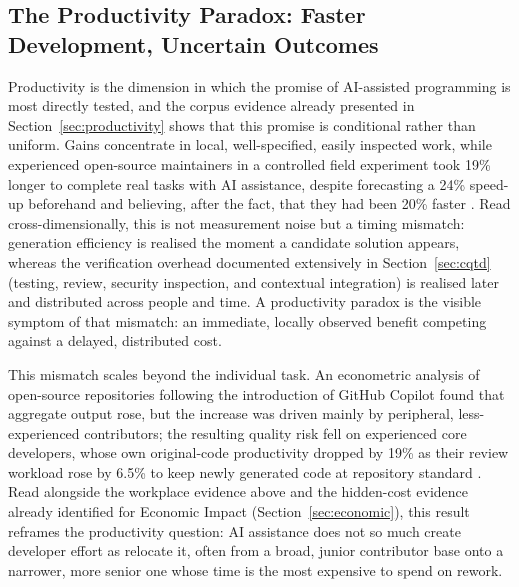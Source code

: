 \subsection{The Productivity Paradox: Faster Development, Uncertain Outcomes}
\label{sec:disc-productivity-paradox}
Productivity is the dimension in which the promise of AI-assisted programming is most directly tested, and the corpus evidence already presented in Section~\ref{sec:productivity} shows that this promise is conditional rather than uniform. Gains concentrate in local, well-specified, easily inspected work, while experienced open-source maintainers in a controlled field experiment took 19\% longer to complete real tasks with AI assistance, despite forecasting a 24\% speed-up beforehand and believing, after the fact, that they had been 20\% faster \cite{becker_measuring_2025}. Read cross-dimensionally, this is not measurement noise but a timing mismatch: generation efficiency is realised the moment a candidate solution appears, whereas the verification overhead documented extensively in Section~\ref{sec:cqtd} (testing, review, security inspection, and contextual integration) is realised later and distributed across people and time. A productivity paradox is the visible symptom of that mismatch: an immediate, locally observed benefit competing against a delayed, distributed cost.

This mismatch scales beyond the individual task. An econometric analysis of open-source repositories following the introduction of GitHub Copilot found that aggregate output rose, but the increase was driven mainly by peripheral, less-experienced contributors; the resulting quality risk fell on experienced core developers, whose own original-code productivity dropped by 19\% as their review workload rose by 6.5\% to keep newly generated code at repository standard \cite{xu_ai-assisted_2026}. Read alongside the workplace evidence above and the hidden-cost evidence already identified for Economic Impact (Section~\ref{sec:economic}), this result reframes the productivity question: AI assistance does not so much create developer effort as relocate it, often from a broad, junior contributor base onto a narrower, more senior one whose time is the most expensive to spend on rework.

